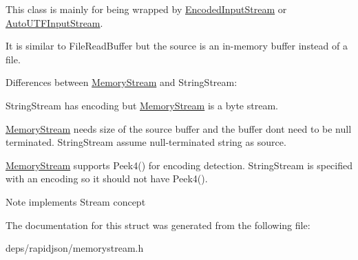 This class is mainly for being wrapped by \hyperlink{class_encoded_input_stream}{Encoded\+Input\+Stream} or \hyperlink{class_auto_u_t_f_input_stream}{Auto\+U\+T\+F\+Input\+Stream}.

It is similar to File\+Read\+Buffer but the source is an in-\/memory buffer instead of a file.

Differences between \hyperlink{struct_memory_stream}{Memory\+Stream} and String\+Stream\+:
\begin{DoxyEnumerate}
\item String\+Stream has encoding but \hyperlink{struct_memory_stream}{Memory\+Stream} is a byte stream.
\item \hyperlink{struct_memory_stream}{Memory\+Stream} needs size of the source buffer and the buffer don\textquotesingle{}t need to be null terminated. String\+Stream assume null-\/terminated string as source.
\item \hyperlink{struct_memory_stream}{Memory\+Stream} supports Peek4() for encoding detection. String\+Stream is specified with an encoding so it should not have Peek4(). \begin{DoxyNote}{Note}
implements Stream concept 
\end{DoxyNote}

\end{DoxyEnumerate}

The documentation for this struct was generated from the following file\+:\begin{DoxyCompactItemize}
\item 
deps/rapidjson/memorystream.\+h\end{DoxyCompactItemize}
